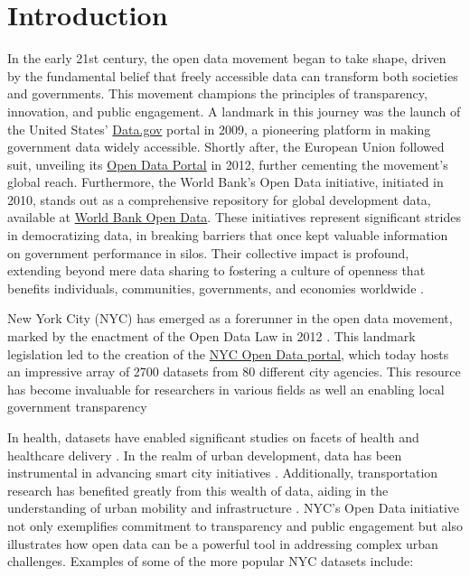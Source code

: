 \documentclass[12pt, titlepage]{article}
\begin{document}
\section{Introduction} \label{sec:intro}
In the early 21st century, the open data movement began to take shape, driven by the 
fundamental belief that freely accessible data can transform 
both societies and governments. This movement champions the principles of 
transparency, innovation, and public engagement. 
A landmark in this journey was the launch of the United States'
\href{https://www.data.gov}{Data.gov} portal in 2009, a pioneering
platform in making government data widely accessible. Shortly after,
the European Union followed suit, unveiling its
\href{https://data.europa.eu/euodp}{Open Data Portal} in 2012, further
cementing the movement's global reach. Furthermore, the World Bank's Open
Data initiative, initiated in 2010, stands out as a comprehensive
repository for global development data, available at
\href{https://data.worldbank.org}{World Bank Open Data}. 
These initiatives represent significant strides in democratizing data, 
in breaking barriers that once kept valuable information 
on government performance in silos. Their collective impact 
is profound, extending beyond mere data sharing to 
fostering a culture of openness that benefits individuals, 
communities, governments, and economies worldwide 
\citep{barns2016mine, wang2016adoption}.

New York City (NYC) has emerged as a forerunner in the open data
movement, marked by the enactment of the Open Data Law in 2012
\citep{zuiderwijk2014open}. This landmark legislation led to the
creation of the \href{https://opendata.cityofnewyork.us}{NYC Open Data
  portal}, which today hosts an impressive array of 2700 datasets
from 80 different city agencies. This resource has become invaluable
for researchers in various fields as well an enabling local government transparency

In health, datasets have enabled
significant studies on facets of health and healthcare delivery
\citep{cantor2018facets, shankar2021data}. In the realm of urban
development, data has been instrumental in advancing smart city
initiatives \citep{neves2020impacts}. Additionally, transportation
research has benefited greatly from this wealth of data, aiding in the
understanding of urban mobility and infrastructure
\citep{gerte2019understanding}. NYC's Open Data initiative not only
exemplifies commitment to transparency and public engagement but also
illustrates how open data can be a powerful tool in addressing complex
urban challenges. Examples of some of the more popular NYC datasets include:
\end{document}
